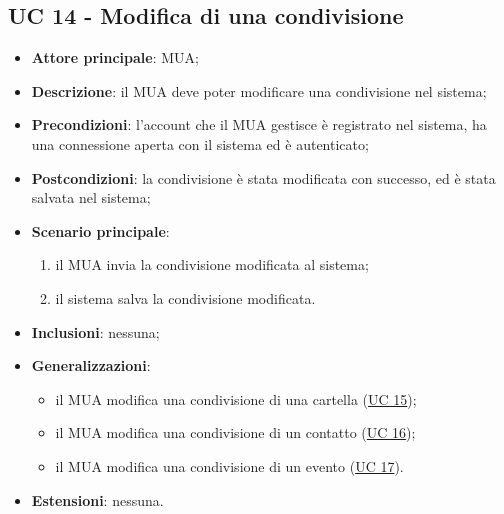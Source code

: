 \subsection{UC 14 - Modifica di una condivisione} \label{sec:UC14}
    \begin{itemize}
        \item \textbf{Attore principale}: MUA;
        \item \textbf{Descrizione}: il MUA deve poter modificare una condivisione nel sistema;
        \item \textbf{Precondizioni}: l’account che il MUA gestisce è registrato nel sistema, ha una connessione aperta con il sistema ed è autenticato;
        \item \textbf{Postcondizioni}: la condivisione è stata modificata con successo, ed è stata salvata nel sistema;
        \item \textbf{Scenario principale}:
            \begin{enumerate}
                \item il MUA invia la condivisione modificata al sistema;
                \item il sistema salva la condivisione modificata.
            \end{enumerate}
        \item \textbf{Inclusioni}: nessuna;
        \item \textbf{Generalizzazioni}:
            \begin{itemize}
                \item il MUA modifica una condivisione di una cartella (\hyperref[sec:UC15]{UC 15});
                \item il MUA modifica una condivisione di un contatto (\hyperref[sec:UC16]{UC 16});
                \item il MUA modifica una condivisione di un evento (\hyperref[sec:UC17]{UC 17}).
            \end{itemize}
        \item \textbf{Estensioni}: nessuna.
    \end{itemize}